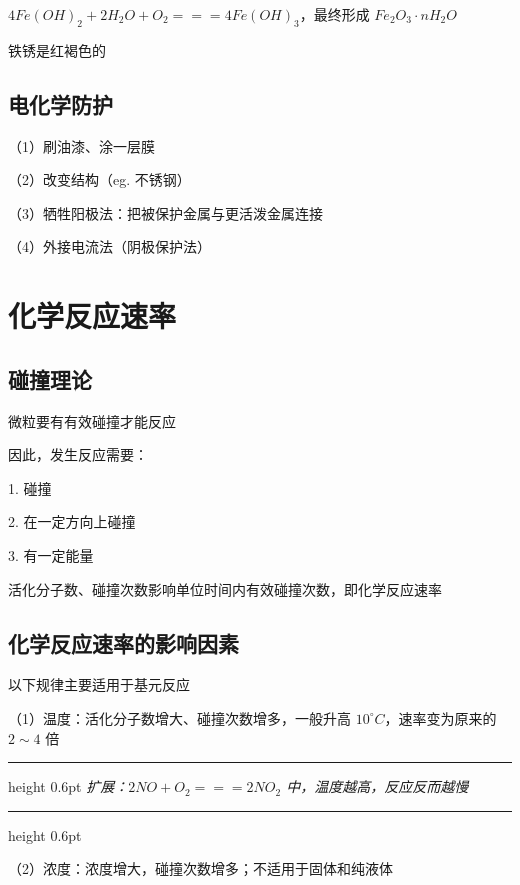\documentclass[UTF8,zihao=-4,openany]{ctexbook}
\newenvironment{notebox}
  {\par\smallskip\noindent\begingroup\begin{minipage}{\linewidth}\color{noteframe}\hrule height 0.6pt\smallskip\color{black}\itshape}
  {\par\smallskip\color{noteframe}\hrule height 0.6pt\end{minipage}\endgroup\par\smallskip}
\begin{document}
$4Fe(OH)_2+2H_2O+O_2=\!=\!=4Fe(OH)_3$，最终形成 $Fe_2O_3\cdot nH_2O$\par

铁锈是红褐色的\par
\subsection{电化学防护}
（1）刷油漆、涂一层膜\par

（2）改变结构（eg. 不锈钢）\par

（3）牺牲阳极法：把被保护金属与更活泼金属连接\par

（4）外接电流法（阴极保护法）\par
\section{化学反应速率}
\subsection{碰撞理论}
微粒要有有效碰撞才能反应\par

因此，发生反应需要：\par

1. 碰撞\par

2. 在一定方向上碰撞\par

3. 有一定能量\par

活化分子数、碰撞次数影响单位时间内有效碰撞次数，即化学反应速率\par
\subsection{化学反应速率的影响因素}
以下规律主要适用于基元反应\par

（1）温度：活化分子数增大、碰撞次数增多，一般升高 $10^{\circ}C$，速率变为原来的 $2\sim4$ 倍\par

\begin{notebox}
扩展：$2NO+O_2=\!=\!=2NO_2$ 中，温度越高，反应反而越慢\par
\end{notebox}
（2）浓度：浓度增大，碰撞次数增多；不适用于固体和纯液体\par
\end{document}
